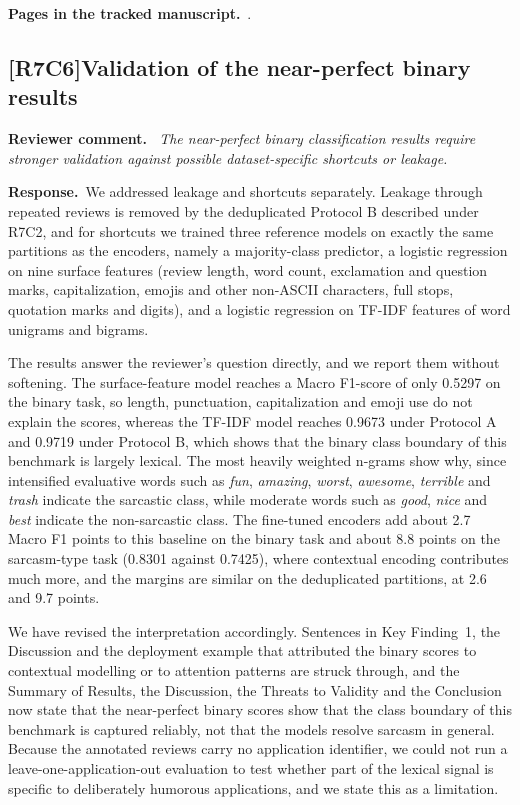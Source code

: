 \documentclass[11pt,a4paper]{article}
\newcommand{\comment}[3]{\subsection*{\textcolor{#1}{[#2]}\enspace #3}}
\newenvironment{reviewercomment}{\par\noindent\textbf{Reviewer comment.}\itshape\ }{\par}
\newcommand{\response}{\par\noindent\textbf{Response.}\ }
\newcommand{\where}[1]{\par\noindent\textbf{Pages in the tracked manuscript.}\ \rvpages[M-]{#1}.}
\begin{document}
\where{R7C5}

\comment{rvSeven}{R7C6}{Validation of the near-perfect binary results}
\begin{reviewercomment}
The near-perfect binary classification results require stronger validation against possible dataset-specific shortcuts or leakage.
\end{reviewercomment}
\response We addressed leakage and shortcuts separately. Leakage through repeated reviews is removed by the deduplicated Protocol B described under R7C2, and for shortcuts we trained three reference models on exactly the same partitions as the encoders, namely a majority-class predictor, a logistic regression on nine surface features (review length, word count, exclamation and question marks, capitalization, emojis and other non-ASCII characters, full stops, quotation marks and digits), and a logistic regression on TF-IDF features of word unigrams and bigrams.

The results answer the reviewer's question directly, and we report them without softening. The surface-feature model reaches a Macro F1-score of only 0.5297 on the binary task, so length, punctuation, capitalization and emoji use do not explain the scores, whereas the TF-IDF model reaches 0.9673 under Protocol A and 0.9719 under Protocol B, which shows that the binary class boundary of this benchmark is largely lexical. The most heavily weighted n-grams show why, since intensified evaluative words such as \textit{fun}, \textit{amazing}, \textit{worst}, \textit{awesome}, \textit{terrible} and \textit{trash} indicate the sarcastic class, while moderate words such as \textit{good}, \textit{nice} and \textit{best} indicate the non-sarcastic class. The fine-tuned encoders add about 2.7 Macro F1 points to this baseline on the binary task and about 8.8 points on the sarcasm-type task (0.8301 against 0.7425), where contextual encoding contributes much more, and the margins are similar on the deduplicated partitions, at 2.6 and 9.7 points.

We have revised the interpretation accordingly. Sentences in Key Finding~1, the Discussion and the deployment example that attributed the binary scores to contextual modelling or to attention patterns are struck through, and the Summary of Results, the Discussion, the Threats to Validity and the Conclusion now state that the near-perfect binary scores show that the class boundary of this benchmark is captured reliably, not that the models resolve sarcasm in general. Because the annotated reviews carry no application identifier, we could not run a leave-one-application-out evaluation to test whether part of the lexical signal is specific to deliberately humorous applications, and we state this as a limitation.
\end{document}
